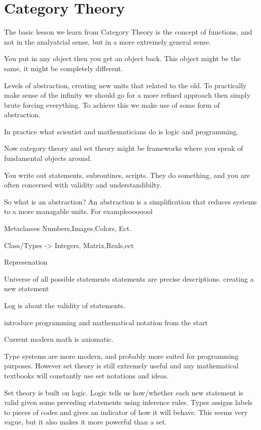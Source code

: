 \documentclass{book}
\begin{document}
\section{Category Theory}
The basic lesson we learn from Category Theory is the concept of functions, and not in the analyatcial sense, but in a more extremely general sense.

You put in any object then you get an object back. This object might be the same, it might be completely different.


Levels of abstraction, creating new units that related to the old.
To practically make sense of the infinity we should go for a more refined approach then simply brute forcing everything. To achieve this we make use of some form of abstraction.

In practice what scientist and mathematicians do is logic and programming. 

Now category theory and set theory might be frameworks where you speak of fundamental objects around. 

You write out statements, subroutines, scripts. They do something, and you are often concerned with validity and understandibilty. 


So what is an abstraction? An abstraction is a simplification that reduces systems to a more managable units. 
For exampleooooool

Metaclasses 
Numbers,Images,Colors, Ect.

Class/Types -> Integers, Matrix,Reals,ect

Represenation

Universe of all possible statements%
statements are precise descriptions.  
creating a new statement 

Log is about the validity of statements. 

introduce programming and mathematical notation from the start

Current modern math is axiomatic. 

	Type systems are more modern, and probably more suited for programming purposes. However set theory is still extremely useful and any mathematical textbooks will constantly use set notations and ideas.
	
	Set theory is built on logic.
	Logic tells us how/whether each new statement is valid given some preceding statements using inference rules.
	Types assigns labels to pieces of codes and gives an indicator of how it will behave. This seems very vague, but it also makes it more powerful than a set.
\end{document}
